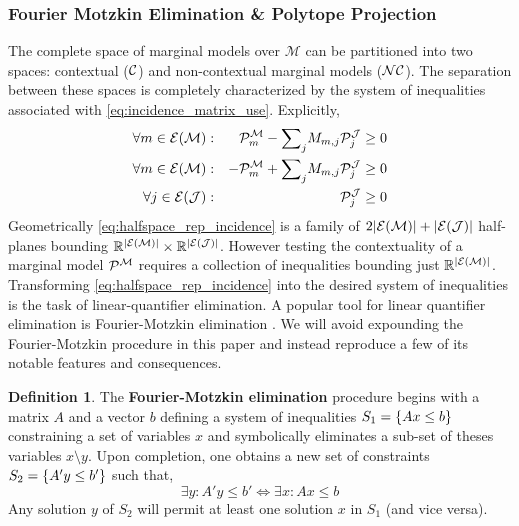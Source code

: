 \documentclass[aps, 10pt, english, twoside, pra, nofootinbib, longbibliography]{revtex4-1}
\theoremstyle{plain}
\theoremstyle{definition}
\newtheorem{definition}[theorem]{Definition}
\theoremstyle{remark}
\newcommand{\mscenario}{\mathcal{M}}
\newcommand{\jointvar}{\mathcal{J}}
\newcommand{\term}[1]{\textcolor{Mahogany}{\textbf{#1}}}
\newcommand{\tcdot}{} %
\newcommand{\Events}[1]{\s{E}\br{#1}} %
\begin{document}
     \\

     \\

     \\

    \subsubsection{Fourier Motzkin Elimination \& Polytope Projection}

    The complete space of marginal models over $\mscenario$ can be partitioned into two spaces: contextual ($\mathcal{C}$) and non-contextual marginal models ($\mathcal{NC}$). The separation between these spaces is completely characterized by the system of inequalities associated with \cref{eq:incidence_matrix_use}. Explicitly,
    \begin{equation} \label{eq:halfspace_rep_incidence}
    \begin{alignedat}{2}
        \forall m \in \Events{\mscenario} :&&\quad \probvec^{\mscenario}_m - {\sum}_{j} M_{m, j} \probvec^{\jointvar}_j &\geq 0 \\
        \forall m \in \Events{\mscenario} :&&\quad -\probvec^{\mscenario}_m + {\sum}_{j} M_{m, j} \probvec^{\jointvar}_j &\geq 0 \\
        \forall j \in \Events{\jointvar} :&&\quad \probvec^{\jointvar}_j &\geq 0
    \end{alignedat}
    \end{equation}
    Geometrically \cref{eq:halfspace_rep_incidence} is a family of $2\abs{\Events{\mscenario}} + \abs{\Events{\jointvar}}$ half-planes bounding $\R^{\abs{\Events{\mscenario}}} \times \R^{\abs{\Events{\jointvar}}}$. However testing the contextuality of a marginal model $\probvec^{\mscenario}$ requires a collection of inequalities bounding just $\R^{\abs{\Events{\mscenario}}}$. Transforming \cref{eq:halfspace_rep_incidence} into the desired system of inequalities is the task of linear-quantifier elimination. A popular tool for linear quantifier elimination is Fourier-Motzkin elimination \cite{Dantzig_1973,Inflation,Abramsky_2012,jones_2004}. We will avoid expounding the Fourier-Motzkin procedure in this paper and instead reproduce a few of its notable features and consequences.

    \begin{definition} \cite[Section 12.2]{Schrijver_1998}
        The \term{Fourier-Motzkin elimination} procedure begins with a matrix $A$ and a vector $b$ defining a system of inequalities $S_1 = \bc{A\tcdot x \leq b}$ constraining a set of variables $x$ and symbolically eliminates a sub-set of theses variables $x \setminus y$. Upon completion, one obtains a new set of constraints $S_2 = \bc{A' y \leq b'}$ such that,
        \[ \exists y : A' y \leq b' \iff \exists x : A x \leq b \]
        Any solution $y$ of $S_2$ will permit at least one solution $x$ in $S_1$ (and vice versa).
    \end{definition}
\end{document}
